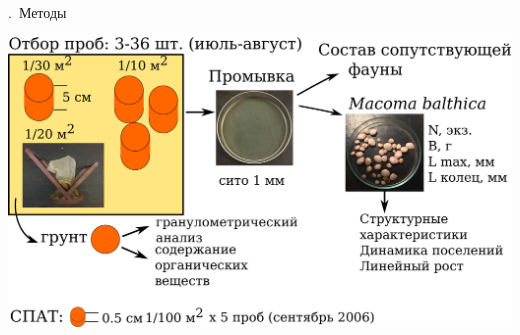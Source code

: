 \documentclass[aspectratio=169, xcolor=table]{beamer}
\begin{document}
\begin{frame}{\insertpagenumber.\ Методы}
 \begin{center}
	\includegraphics[height=.8\textheight]{./sampling_compressed.pdf}
 \end{center}
\end{frame}

\end{document}
